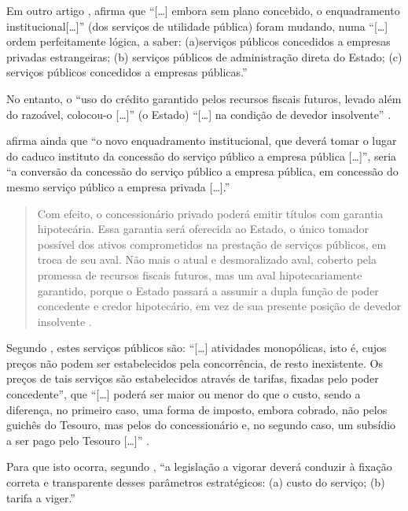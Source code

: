 \documentclass[]{article}
\begin{document}
Em outro artigo \cite[p.~717]{rangel1987}, 
afirma que ``{[}\ldots{}{]} embora sem plano concebido, o enquadramento
institucional{[}\ldots{}{]}'' (dos serviços de utilidade pública) foram
mudando, numa ``{[}\ldots{}{]} ordem perfeitamente lógica, a saber:
(a)serviços públicos concedidos a empresas privadas estrangeiras; (b)
serviços públicos de administração direta do Estado; (c) serviços
públicos concedidos a empresas públicas.''

No entanto, o ``uso do crédito garantido pelos recursos fiscais futuros,
levado além do razoável, colocou-o {[}\ldots{}{]}'' (o Estado)
``{[}\ldots{}{]} na condição de devedor insolvente''
\cite[p.~718]{rangel1987}.

 afirma ainda que ``o novo enquadramento
institucional, que deverá tomar o lugar do caduco instituto da concessão
do serviço público a empresa pública {[}\ldots{}{]}'', seria ``a
conversão da concessão do serviço público a empresa pública, em
concessão do mesmo serviço público a empresa privada {[}\ldots{}{]}.''

\begin{quote}
Com efeito, o concessionário privado poderá emitir títulos com garantia
hipotecária. Essa garantia será oferecida ao Estado, o único tomador
possível dos ativos comprometidos na prestação de serviços públicos, em
troca de seu aval. Não mais o atual e desmoralizado aval, coberto pela
promessa de recursos fiscais futuros, mas um aval hipotecariamente
garantido, porque o Estado passará a assumir a dupla função de poder
concedente e credor hipotecário, em vez de sua presente posição de
devedor insolvente \cite[p.~719]{rangel1987}.
\end{quote}

Segundo , estes serviços públicos são:
``{[}\ldots{}{]} atividades monopólicas, isto é, cujos preços não podem
ser estabelecidos pela concorrência, de resto inexistente. Os preços de
tais serviços são estabelecidos através de tarifas, fixadas pelo poder
concedente'', que ``{[}\ldots{}{]} poderá ser maior ou menor do que o
custo, sendo a diferença, no primeiro caso, uma forma de imposto, embora
cobrado, não pelos guichês do Tesouro, mas pelos do concessionário e, no
segundo caso, um subsídio a ser pago pelo Tesouro {[}\ldots{}{]}''
\cite[p.~721]{rangel1987}.

Para que isto ocorra, segundo , ``a
legislação a vigorar deverá conduzir à fixação correta e transparente
desses parâmetros estratégicos: (a) custo do serviço; (b) tarifa a
viger.''
\end{document}
